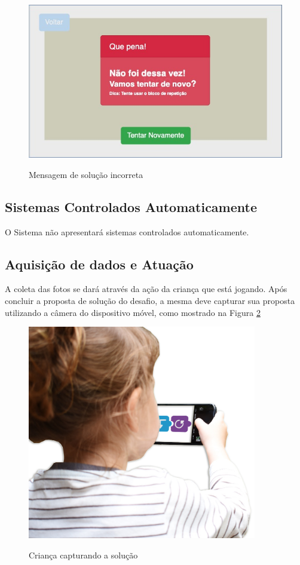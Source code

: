     \begin{figure}[H]
        \caption{Mensagem de solução incorreta}
        \centering
        \includegraphics[width=\linewidth]{Imagens/cap3/solucao_incorreta.jpg}
        \label{figura:solucao_incorreta}
    \end{figure}
    
    
    \subsection{Sistemas Controlados Automaticamente}
    O Sistema não apresentará sistemas controlados automaticamente.
    
    \subsection{Aquisição de dados e Atuação}
    A coleta das fotos se dará através da ação da criança que está jogando. Após concluir a proposta de solução do desafio, a mesma deve capturar sua proposta utilizando a câmera do dispositivo móvel, como mostrado na Figura \ref{figura:crianca_blocos}
    
    \begin{figure}[H]
        \caption{Criança capturando a solução}
        \centering
        \includegraphics[width=10cm]{Imagens/cap3/CriançaBlocos.jpg}
        \label{figura:crianca_blocos}
    \end{figure}
    
